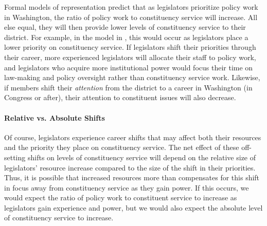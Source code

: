 \documentclass[12pt]{article}
\begin{document}
Formal models of representation predict that as legislators prioritize policy work in Washington, the ratio of policy work to constituency service will increase. All else equal, they will then provide lower levels of constituency service to their district. For example, in the model in \cite{AshworthBuenodeMesquita2006}, this would occur as legislators place a lower priority on constituency service. If legislators shift their priorities through their career, more experienced legislators will allocate their staff to policy work, and legislators who acquire more institutional power would focus their time on law-making and policy oversight rather than constituency service work. Likewise, if members shift their \textit{attention} from the district to a career in Washington (in Congress or after), their attention to constituent issues will also decrease. 


\paragraph{Relative vs. Absolute Shifts} Of course, legislators experience career shifts that may affect both their resources and the priority they place on constituency service. The net effect of these off-setting shifts on levels of constituency service will depend on the relative size of legislators' resource increase compared to the size of the shift in their priorities. Thus, it is possible that increased resources more than compensates for this shift in focus away from constituency service as they gain power.
If this occurs, we would expect the ratio of policy work to constituent service to increase as legislators gain experience and power, but we would also expect the absolute level of constituency service to increase.



\end{document}
